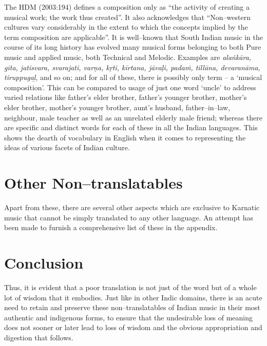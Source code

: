 The HDM (2003:194) defines a composition only as “the activity of creating a musical work; the work thus created”. It also acknowledges that “Non–western cultures vary considerably in the extent to which the concepts implied by the term composition are applicable”. It is well–known that South Indian music in the course of its long history has evolved many musical forms belonging to both Pure music and applied music, both Technical and Melodic. Examples are \textit{alaṅkāra, gīta, jatisvara, svarajati, varṇa, kṛti, kīrtana, jāvaḷi, padaṁ, tillāna, devaranāma, tiruppugaḻ}, and so on; and for all of these, there is possibly only term – a ‘musical composition’. This can be compared to usage of just one word ‘uncle’ to address varied relations like father’s elder brother, father’s younger brother, mother’s elder brother, mother’s younger brother, aunt’s husband, father–in–law, neighbour, male teacher as well as an unrelated elderly male friend; whereas there are specific and distinct words for each of these in all the Indian languages. This shows the dearth of vocabulary in English when it comes to representing the ideas of various facets of Indian culture.


\section*{Other Non–translatables}

Apart from these, there are several other aspects which are exclusive to Karnatic music that cannot be simply translated to any other language. An attempt has been made to furnish a comprehensive list of these in the appendix.


\section*{Conclusion}

Thus, it is evident that a poor translation is not just of the word but of a whole lot of wisdom that it embodies. Just like in other Indic domains, there is an acute need to retain and preserve these non–translatables of Indian music in their most authentic and indigenous forms, to ensure that the undesirable loss of meaning does not sooner or later lead to loss of wisdom and the obvious appropriation and digestion that follows. 


